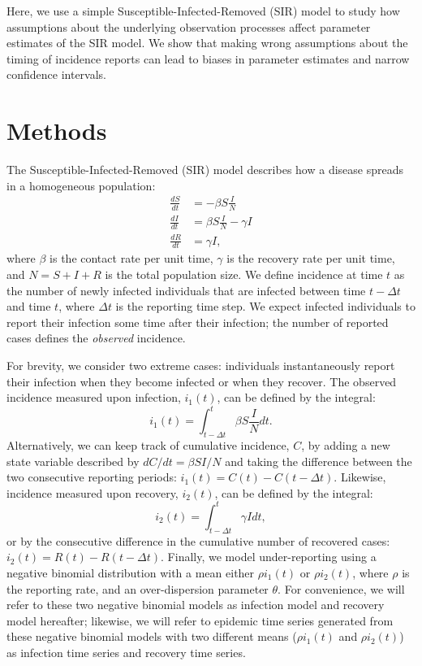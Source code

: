 \documentclass{article}\usepackage[]{graphicx}\usepackage[]{color}
\begin{document}
Here, we use a simple Susceptible-Infected-Removed (SIR) model to study how 
assumptions about the underlying observation processes affect parameter estimates
of the SIR model. We show that making wrong assumptions about the timing of 
incidence reports can lead to biases in parameter estimates and narrow 
confidence intervals. 

\section{Methods}

The Susceptible-Infected-Removed (SIR) model describes how a disease spreads in a
homogeneous population:
\begin{equation}
\begin{aligned}
\frac{dS}{dt} &= - \beta S \frac{I}{N}\\
\frac{dI}{dt} &= \beta S \frac{I}{N} - \gamma I\\
\frac{dR}{dt} &= \gamma I,
\end{aligned}
\end{equation}
where $\beta$ is the contact rate per unit time, $\gamma$ is the recovery rate per unit time, 
and $N = S + I + R$ is the total population size. 
We define incidence at time $t$ as the number of newly infected
individuals that are infected between time $t- \Delta t$ and time $t$, where $\Delta t$ is
the reporting time step. We expect infected individuals to report their infection some time
after their infection; the number of reported cases defines the \emph{observed} incidence. 

For brevity, we consider two extreme cases: individuals instantaneously report
their infection when they become infected or when they recover. The observed incidence 
measured upon infection, $i_1(t)$, can be defined by the integral:
\begin{equation}
i_1(t) = \int_{t - \Delta t}^{t} \beta S \frac{I}{N} dt.
\end{equation}
Alternatively, we can keep track of cumulative incidence, $C$, by adding a 
new state variable described by $dC/dt = \beta S I/N$ and taking the difference between 
the two consecutive reporting periods: $i_1(t) = C(t) - C(t-\Delta t)$. Likewise, 
incidence measured upon recovery, $i_2(t)$, can be defined by the integral:
\begin{equation}
i_2(t) = \int_{t-\Delta t}^{t} \gamma I dt,
\end{equation}
or by the consecutive difference in the cumulative number of recovered cases:
$i_2(t) = R(t) - R(t - \Delta t)$.
Finally, we model under-reporting using a negative binomial distribution with a
mean either $\rho i_1(t)$ or $\rho i_2(t)$, where $\rho$ is the reporting rate, and
an over-dispersion parameter $\theta$. For convenience, we will refer to these two
negative binomial models as infection model and recovery model hereafter; 
likewise, we will refer to epidemic time series generated from these
negative binomial models with two different means ($\rho i_1(t)$ and $\rho i_2(t)$)
as infection time series and recovery time series.
\end{document}
